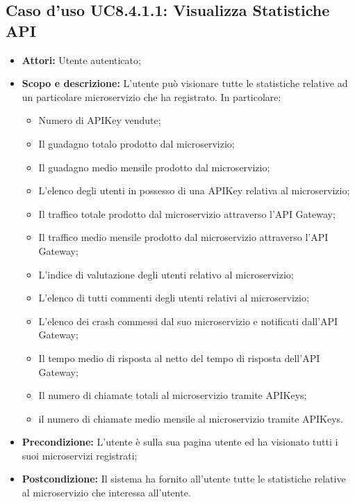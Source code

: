 \documentclass[12pt,a4paper,titlepage]{article}
\begin{document}
	\subsection{Caso d'uso UC8.4.1.1: Visualizza Statistiche API}
	\label{UC8.4.1.1}
	\begin{itemize}
		\item \textbf{Attori: }Utente autenticato;
		\item \textbf{Scopo e descrizione: }L'utente può visionare tutte le statistiche relative ad un particolare microservizio che ha registrato. In particolare:
		\begin{itemize}
			\item Numero di APIKey vendute;
			\item Il guadagno totalo prodotto dal microservizio;
			\item Il guadagno medio mensile prodotto dal microservizio;
			\item L'elenco degli utenti in possesso di una APIKey relativa al microservizio;
			\item Il traffico totale prodotto dal microservizio attraverso l'API Gateway;
			\item Il traffico medio mensile prodotto dal microservizio attraverso l'API Gateway;
			\item L'indice di valutazione degli utenti relativo al microservizio;
			\item L'elenco di tutti commenti degli utenti relativi al microservizio;
			\item L'elenco dei crash commessi dal suo microservizio e notificati dall'API Gateway;
			\item Il tempo medio di risposta al netto del tempo di risposta dell'API Gateway;
			\item Il numero di chiamate totali al microservizio tramite APIKeys;
			\item il numero di chiamate medio mensile al microservizio tramite APIKeys.
		\end{itemize}
		\item \textbf{Precondizione: }L'utente è sulla sua pagina utente ed ha visionato tutti i suoi microservizi registrati;
		\item \textbf{Postcondizione: }Il sistema ha fornito all'utente tutte le statistiche relative al microservizio che interessa all'utente.
	\end{itemize}
\end{document}
